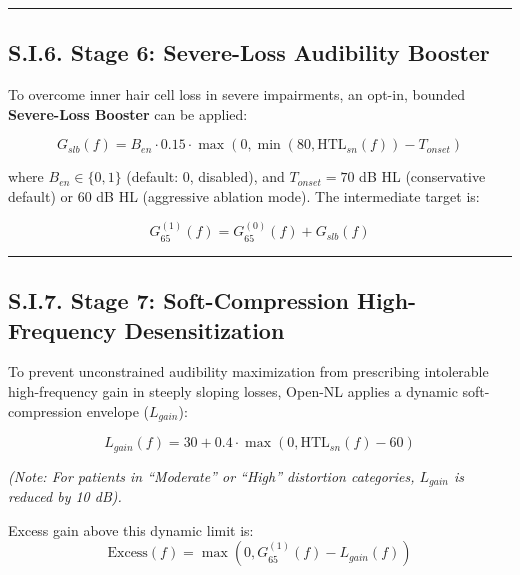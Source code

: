 \documentclass[
  12pt,
]{article}
\begin{document}
\begin{center}\rule{0.5\linewidth}{0.5pt}\end{center}

\subsection{S.I.6. Stage 6: Severe-Loss Audibility
Booster}\label{s.i.6.-stage-6-severe-loss-audibility-booster}

To overcome inner hair cell loss in severe impairments, an opt-in,
bounded \textbf{Severe-Loss Booster} can be applied:

\begin{equation}
G_{slb}(f) = B_{en} \cdot 0.15 \cdot \max\left(0, \min(80, \text{HTL}_{sn}(f)) - T_{onset}\right)
\end{equation}

where \(B_{en} \in \{0, 1\}\) (default: 0, disabled), and
\(T_{onset} = 70\) dB HL (conservative default) or \(60\) dB HL
(aggressive ablation mode). The intermediate target is:

\begin{equation}
G_{65}^{(1)}(f) = G_{65}^{(0)}(f) + G_{slb}(f)
\end{equation}

\begin{center}\rule{0.5\linewidth}{0.5pt}\end{center}

\subsection{S.I.7. Stage 7: Soft-Compression High-Frequency
Desensitization}\label{s.i.7.-stage-7-soft-compression-high-frequency-desensitization}

To prevent unconstrained audibility maximization from prescribing
intolerable high-frequency gain in steeply sloping losses, Open-NL
applies a dynamic soft-compression envelope (\(L_{gain}\)):

\begin{equation}
L_{gain}(f) = 30 + 0.4 \cdot \max\left(0, \text{HTL}_{sn}(f) - 60\right)
\end{equation}

\emph{(Note: For patients in ``Moderate'' or ``High'' distortion
categories, \(L_{gain}\) is reduced by 10 dB).}

Excess gain above this dynamic limit is: \begin{equation}
\text{Excess}(f) = \max\left(0, G_{65}^{(1)}(f) - L_{gain}(f)\right)
\end{equation}
\end{document}
